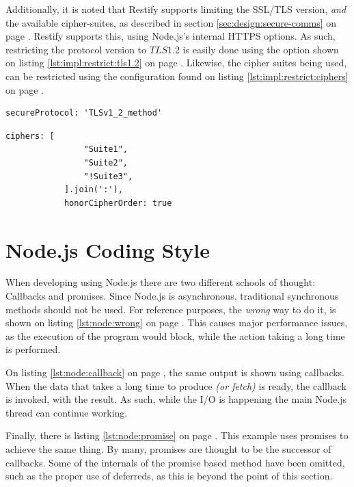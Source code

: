 		Additionally, it is noted that Restify supports limiting the SSL/TLS version, \emph{and} the available cipher-suites, as described in section \ref{sec:design:secure-comms} on page \pageref{sec:design:secure-comms}. Restify supports this, using Node.js's internal HTTPS options. As such, restricting the protocol version to $TLS1.2$ is easily done using the option shown on listing \ref{lst:impl:restrict:tls1.2} on page \pageref{lst:impl:restrict:tls1.2}. Likewise, the cipher suites being used, can be restricted using the configuration found on listing \ref{lst:impl:restrict:ciphers} on page \pageref{lst:impl:restrict:ciphers}.

		\begin{lstlisting}[style=json2,gobble=12, caption={Restricting Restify to use TLS 1.2},label={lst:impl:restrict:tls1.2}]
            secureProtocol: 'TLSv1_2_method'
		\end{lstlisting}

		\begin{lstlisting}[style=json2,gobble=12, caption={Restricting the TLS cipher suites that Restify uses. Ciphers here are \emph{examples}, as the actual list would take up too much place.},label={lst:impl:restrict:ciphers}]
            ciphers: [
                "Suite1",
                "Suite2",
                "!Suite3",
            ].join(':'),
            honorCipherOrder: true
		\end{lstlisting}


	\section{Node.js Coding Style}
		\label{sec:impl:node:style}
		When developing using Node.js there are two different schools of thought: Callbacks and promises. Since Node.js is asynchronous, traditional synchronous methods should not be used. For reference purposes, the \emph{wrong} way to do it, is shown on listing \ref{lst:node:wrong} on page \pageref{lst:node:wrong}. This causes major performance issues, as the execution of the program would block, while the action taking a long time is performed.

		On listing \ref{lst:node:callback} on page \pageref{lst:node:callback}, the same output is shown using callbacks. When the data that takes a long time to produce \emph{(or fetch)} is ready, the callback is invoked, with the result. As such, while the I/O is happening the main Node.js thread can continue working.

		Finally, there is listing \ref{lst:node:promise} on page \pageref{lst:node:callback}. This example uses promises to achieve the same thing. By many, promises are thought to be the successor of callbacks. Some of the internals of the promise based method have been omitted, such as the proper use of deferreds, as this is beyond the point of this section.

